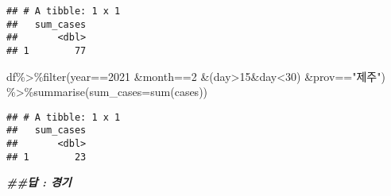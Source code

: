 \documentclass[
]{article}
\newenvironment{Shaded}{\begin{snugshade}}{\end{snugshade}}
\newcommand{\AttributeTok}[1]{\textcolor[rgb]{0.77,0.63,0.00}{#1}}
\newcommand{\DecValTok}[1]{\textcolor[rgb]{0.00,0.00,0.81}{#1}}
\newcommand{\DocumentationTok}[1]{\textcolor[rgb]{0.56,0.35,0.01}{\textbf{\textit{#1}}}}
\newcommand{\FunctionTok}[1]{\textcolor[rgb]{0.00,0.00,0.00}{#1}}
\newcommand{\NormalTok}[1]{#1}
\newcommand{\SpecialCharTok}[1]{\textcolor[rgb]{0.00,0.00,0.00}{#1}}
\newcommand{\StringTok}[1]{\textcolor[rgb]{0.31,0.60,0.02}{#1}}
\begin{document}
\begin{verbatim}
## # A tibble: 1 x 1
##   sum_cases
##       <dbl>
## 1        77
\end{verbatim}

\begin{Shaded}
\begin{Highlighting}[]
\NormalTok{df}\SpecialCharTok{\%\textgreater{}\%}\FunctionTok{filter}\NormalTok{(year}\SpecialCharTok{==}\DecValTok{2021} \SpecialCharTok{\&}\NormalTok{month}\SpecialCharTok{==}\DecValTok{2} \SpecialCharTok{\&}\NormalTok{(day}\SpecialCharTok{\textgreater{}}\DecValTok{15}\SpecialCharTok{\&}\NormalTok{day}\SpecialCharTok{\textless{}}\DecValTok{30}\NormalTok{) }\SpecialCharTok{\&}\NormalTok{prov}\SpecialCharTok{==}\StringTok{"제주"}\NormalTok{) }\SpecialCharTok{\%\textgreater{}\%}\FunctionTok{summarise}\NormalTok{(}\AttributeTok{sum\_cases=}\FunctionTok{sum}\NormalTok{(cases))}
\end{Highlighting}
\end{Shaded}

\begin{verbatim}
## # A tibble: 1 x 1
##   sum_cases
##       <dbl>
## 1        23
\end{verbatim}

\begin{Shaded}
\begin{Highlighting}[]
\DocumentationTok{\#\#답 : 경기}
\end{Highlighting}
\end{Shaded}
\end{document}
